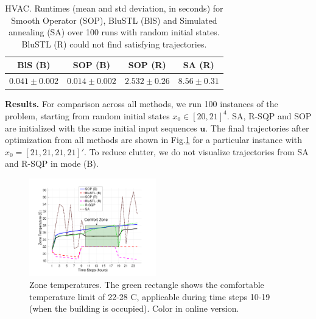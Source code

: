 \begin{table}[tb]
\small
\begin{center}
\caption{{\small HVAC. Runtimes (mean and std deviation, in seconds) for Smooth Operator (SOP), BluSTL (BlS) and Simulated annealing (SA) over 100 runs with random initial states. BluSTL (R) could not find satisfying trajectories.}}
\vspace{-5pt}
\label{tbl:time_performance_bldg}
\begin{tabular} {|c|c|c|c|}
	\hline
	BlS (B) & SOP (B) & SOP (R) & SA (R) \\ \hline
	 $0.041 \pm 0.002$ &  $\mathbf{0.014 \pm 0.002}$  &  $2.532 \pm 0.26$ & $8.56 \pm 0.31$ \\ \hline 
\end{tabular}	
\end{center}
\vspace{-10pt}
\end{table}



\textbf{Results.} For comparison across all methods, we run 100 instances of the problem, starting from random initial states $x_0 \in [20,21]^4$. SA, R-SQP and SOP are initialized with the same initial input sequences $\mathbf{u}$. 
The final trajectories after optimization from all methods are shown in Fig.\ref{fig:ZoneTemp} for a particular instance with $x_0 = [21,21,21,21]'$. To reduce clutter, we do not visualize trajectories from SA and R-SQP in mode (B).

\begin{figure}[t]
\centering
\includegraphics[width=0.49\textwidth]{figures/ZoneTempFinal}
\vspace{-20pt}
\caption{\small{Zone temperatures. The green rectangle shows the comfortable temperature limit of 22-28 C, applicable during time steps 10-19 (when the building is occupied). Color in online version.}}
\label{fig:ZoneTemp}
\vspace{-10pt}
\end{figure}


